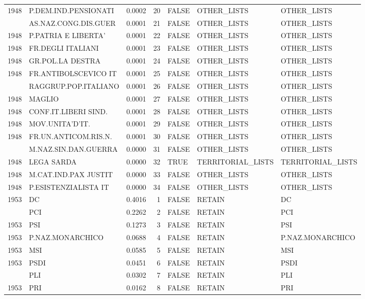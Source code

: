 \begin{longtable}[t]{rlrrlll}
1948 & P.DEM.IND.PENSIONATI & 0.0002 & 20 & FALSE & OTHER\_LISTS & OTHER\_LISTS\\
\addlinespace
1948 & AS.NAZ.CONG.DIS.GUER & 0.0001 & 21 & FALSE & OTHER\_LISTS & OTHER\_LISTS\\
1948 & P.PATRIA E LIBERTA' & 0.0001 & 22 & FALSE & OTHER\_LISTS & OTHER\_LISTS\\
1948 & FR.DEGLI ITALIANI & 0.0001 & 23 & FALSE & OTHER\_LISTS & OTHER\_LISTS\\
1948 & GR.POL.LA DESTRA & 0.0001 & 24 & FALSE & OTHER\_LISTS & OTHER\_LISTS\\
1948 & FR.ANTIBOLSCEVICO IT & 0.0001 & 25 & FALSE & OTHER\_LISTS & OTHER\_LISTS\\
\addlinespace
1948 & RAGGRUP.POP.ITALIANO & 0.0001 & 26 & FALSE & OTHER\_LISTS & OTHER\_LISTS\\
1948 & MAGLIO & 0.0001 & 27 & FALSE & OTHER\_LISTS & OTHER\_LISTS\\
1948 & CONF.IT.LIBERI SIND. & 0.0001 & 28 & FALSE & OTHER\_LISTS & OTHER\_LISTS\\
1948 & MOV.UNITA'D'IT. & 0.0001 & 29 & FALSE & OTHER\_LISTS & OTHER\_LISTS\\
1948 & FR.UN.ANTICOM.RIS.N. & 0.0001 & 30 & FALSE & OTHER\_LISTS & OTHER\_LISTS\\
\addlinespace
1948 & M.NAZ.SIN.DAN.GUERRA & 0.0000 & 31 & FALSE & OTHER\_LISTS & OTHER\_LISTS\\
1948 & LEGA SARDA & 0.0000 & 32 & TRUE & TERRITORIAL\_LISTS & TERRITORIAL\_LISTS\\
1948 & M.CAT.IND.PAX JUSTIT & 0.0000 & 33 & FALSE & OTHER\_LISTS & OTHER\_LISTS\\
1948 & P.ESISTENZIALISTA IT & 0.0000 & 34 & FALSE & OTHER\_LISTS & OTHER\_LISTS\\
1953 & DC & 0.4016 & 1 & FALSE & RETAIN & DC\\
\addlinespace
1953 & PCI & 0.2262 & 2 & FALSE & RETAIN & PCI\\
1953 & PSI & 0.1273 & 3 & FALSE & RETAIN & PSI\\
1953 & P.NAZ.MONARCHICO & 0.0688 & 4 & FALSE & RETAIN & P.NAZ.MONARCHICO\\
1953 & MSI & 0.0585 & 5 & FALSE & RETAIN & MSI\\
1953 & PSDI & 0.0451 & 6 & FALSE & RETAIN & PSDI\\
\addlinespace
1953 & PLI & 0.0302 & 7 & FALSE & RETAIN & PLI\\
1953 & PRI & 0.0162 & 8 & FALSE & RETAIN & PRI\\

\end{longtable}

